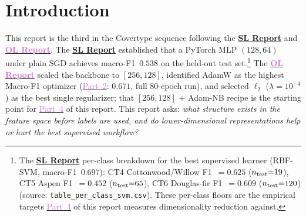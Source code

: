 \documentclass[conference]{IEEEtran}
\newcommand{\SLref}{\href{https://www.dropbox.com/scl/fi/ob48hd7jwzi7fvihme05y/SL_Report_tleung37.pdf?rlkey=aitdwr04ohomlk9vbz2676ol4&st=oipz05t3&dl=0}{\textcolor{denim}{\textbf{SL Report}}}}
\newcommand{\OLref}{\href{https://www.dropbox.com/scl/fi/nizvo97qjzh17yvg8tfx9/OL_Report_tleung37.pdf?rlkey=1e7489vvcymvtchtae00oury4&st=zgtxzg6s&dl=0}{\textcolor{orchid}{\textbf{OL Report}}}}
\newcommand{\Ltwo}{$\ell_2$}
\newcommand{\partref}[2]{\hyperref[#2]{\textcolor{orchid}{Part~#1}}}
\begin{document}
{%
\begin{abstract}
We investigate the geometric structure of the Forest Cover Type (Covertype)
dataset through unsupervised learning. K-Means and Gaussian Mixture Models
(GMM/EM) applied to the original 54-dimensional feature space yield low
cluster--label alignment (ARI $\leq 0.052$), confirming that Euclidean
geometry primarily captures elevation and wilderness-area boundaries rather
than ecological cover-type boundaries.
Principal Component Analysis (PCA) retains 90\,\% of variance in only 10
components, ICA extracts 20 independent components (mean $|\kappa|{=}6.05$,
12 of 20 with $|\kappa|\geq3$), and Randomized Projections (RP) preserve
mean pairwise distances faithfully across five seeds (seed-to-seed variation
in mean ratio: $0.0045$), but individual pair distortions reach ${\pm}12\%$.
PCA-reduced features yield the highest downstream MLP Macro-F1 of
$\mathbf{0.6951}$, outperforming both the original-feature baseline
(0.6803) and ICA/RP representations.
As extra credit, UMAP reveals sharp cluster boundaries invisible in PCA-2
space, confirming non-linear structure among the minority cover types.
\end{abstract}

\section{Introduction}\label{sec:intro}

This report is the third in the Covertype sequence following the \SLref{} and \OLref{}.
The \SLref{} established that a PyTorch MLP $(128, 64)$ under
plain SGD achieves macro-F1~$0.538$ on the held-out test set.\footnote{The
\SLref{} per-class breakdown for the best supervised learner (RBF-SVM, macro-F1~$0.697$):
CT4 Cottonwood/Willow F1~$= 0.625$ ($n_{\rm test}{=}19$),
CT5 Aspen F1~$= 0.452$ ($n_{\rm test}{=}65$),
CT6 Douglas-fir F1~$= 0.609$ ($n_{\rm test}{=}120$)
(source: \texttt{table\_per\_class\_svm.csv}).
These per-class floors are the empirical targets \partref{4}{sec:p4} of this report
measures dimensionality reduction against.}
The \OLref{} scaled the backbone to $[256, 128]$, identified AdamW
as the highest Macro-F1 optimizer (\partref{2}{sec:p2}: $0.671$, full 80-epoch run), and selected
\Ltwo{} ($\lambda{=}10^{-4}$) as the best single regularizer; that
$[256, 128]$ + Adam-NB recipe is the starting point for \partref{4}{sec:p4} of this report.
This report asks: \emph{what structure exists in the feature space before
labels are used, and do lower-dimensional representations help or hurt
the best supervised workflow?}

}
\end{document}
